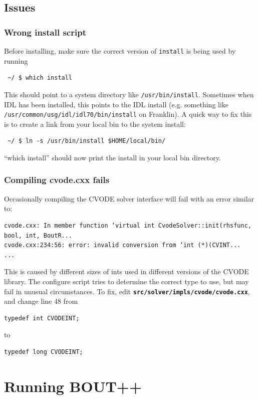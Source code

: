\documentclass[12pt]{article}
\newcommand{\file}[1]{\texttt{\bf #1}}
\begin{document}
\subsection{Issues}

\subsubsection{Wrong install script}
Before installing, make sure the correct version of \texttt{install} is being used by running
\begin{verbatim}
 ~/ $ which install
\end{verbatim}
This should point to a system directory like \texttt{/usr/bin/install}. Sometimes when IDL has been
installed, this points to the IDL install (e.g. something like \texttt{/usr/common/usg/idl/idl70/bin/install} on Franklin). A quick way to fix this is to create a link from your local bin to the system install:
\begin{verbatim}
 ~/ $ ln -s /usr/bin/install $HOME/local/bin/
\end{verbatim}
``which install'' should now print the install in your local bin directory.

\subsubsection{Compiling cvode.cxx fails}
Occasionally compiling the CVODE solver interface will fail with an error similar to:
\begin{verbatim}
cvode.cxx: In member function ‘virtual int CvodeSolver::init(rhsfunc, bool, int, BoutR...
cvode.cxx:234:56: error: invalid conversion from ‘int (*)(CVINT...
...
\end{verbatim}

This is caused by different sizes of ints used in different versions of the CVODE library.
The configure script tries to determine the correct type to use, but may fail in unusual circumstances.
To fix, edit
\file{src/solver/impls/cvode/cvode.cxx}, and change line 48 from
\begin{lstlisting}[numbers=none]
typedef int CVODEINT;
\end{lstlisting}
to
\begin{lstlisting}[numbers=none]
typedef long CVODEINT;
\end{lstlisting}

\section{Running BOUT++}
\label{sec:running}
\end{document}
